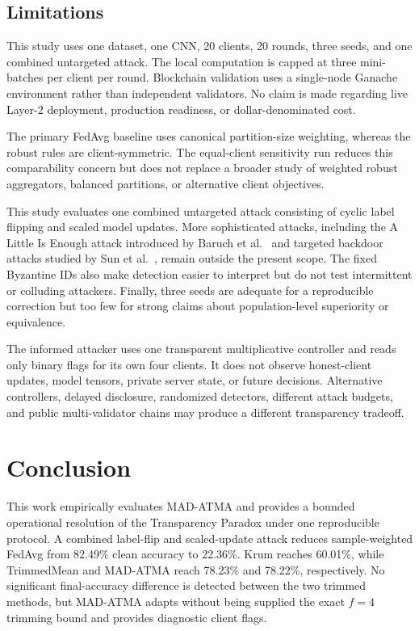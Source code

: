 \documentclass[10pt,letterpaper]{article}
\begin{document}
\subsection{Limitations}

This study uses one dataset, one CNN, 20 clients, 20 rounds, three seeds, and
one combined untargeted attack. The local computation is capped at three
mini-batches per client per round. Blockchain validation uses a single-node
Ganache environment rather than independent validators. No claim is made
regarding live Layer-2 deployment, production readiness, or dollar-denominated
cost.

The primary FedAvg baseline uses canonical partition-size weighting, whereas
the robust rules are client-symmetric. The equal-client sensitivity run reduces
this comparability concern but does not replace a broader study of weighted
robust aggregators, balanced partitions, or alternative client objectives.

This study evaluates one combined untargeted attack consisting of cyclic label
flipping and scaled model updates. More sophisticated attacks, including the A
Little Is Enough attack introduced by Baruch et al.~\cite{baruch2019} and
targeted backdoor attacks studied by Sun et al.~\cite{sun2019}, remain outside
the present scope. The fixed Byzantine IDs also make detection easier to
interpret but do not test intermittent or colluding attackers. Finally, three
seeds are adequate for a reproducible correction but too few for strong claims
about population-level superiority or equivalence.

The informed attacker uses one transparent multiplicative controller and reads
only binary flags for its own four clients. It does not observe honest-client
updates, model tensors, private server state, or future decisions. Alternative
controllers, delayed disclosure, randomized detectors, different attack budgets,
and public multi-validator chains may produce a different transparency tradeoff.

\section{Conclusion}

This work empirically evaluates MAD-ATMA and provides a bounded operational
resolution of the Transparency Paradox under one reproducible protocol. A
combined label-flip and scaled-update attack reduces sample-weighted FedAvg from
82.49\% clean accuracy to 22.36\%. Krum reaches 60.01\%, while TrimmedMean and
MAD-ATMA reach 78.23\% and 78.22\%, respectively. No significant final-accuracy
difference is detected between the two trimmed methods, but MAD-ATMA adapts
without being supplied the exact $f=4$ trimming bound and provides diagnostic
client flags.
\end{document}

